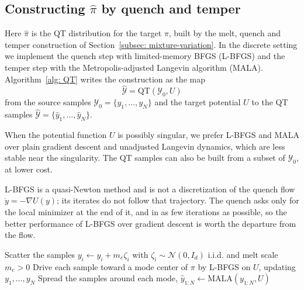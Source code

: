 \documentclass{article}
\begin{document}
\subsection{Constructing \texorpdfstring{$\hat\pi$}{pi-hat} by quench and temper}
\label{subsec: QT}

Here $\hat\pi$ is the QT distribution for the target $\pi$, built by the melt, quench and temper construction of Section~\ref{subsec: mixture-variation}. In the discrete setting we implement the quench step with limited-memory BFGS (L-BFGS) \citep{liu1989limited} and the temper step with the Metropolis-adjusted Langevin algorithm (MALA). Algorithm~\ref{alg: QT} writes the construction as the map
\begin{equation*}
    \hat{\mathcal Y} = \mathrm{QT}(\mathcal Y_0,U)
\end{equation*}
from the source samples $\mathcal Y_0=\{y_1,\dots,y_N\}$ and the target potential $U$ to the QT samples $\hat{\mathcal Y}=\{\hat y_1,\dots,\hat y_N\}$.

When the potential function $U$ is possibly singular, we prefer L-BFGS and MALA over plain gradient descent and unadjusted Langevin dynamics, which are less stable near the singularity. The QT samples can also be built from a subset of $\mathcal Y_0$, at lower cost.

\begin{remark}
	L-BFGS is a quasi-Newton method \citep{liu1989limited} and is not a discretization of the quench flow $\dot y = -\nabla U(y)$; its iterates do not follow that trajectory. The quench asks only for the local minimizer at the end of it, and in as few iterations as possible, so the better performance of L-BFGS over gradient descent is worth the departure from the flow.
\end{remark}

\begin{algorithm}[htb]
\caption{QT: wide-coverage construction}
\label{alg: QT}
Scatter the samples $y_i \gets y_i + m_e\zeta_i$ with $\zeta_i \sim \mathcal N(0, I_d)$ i.i.d. and melt scale $m_e > 0$\;
Drive each sample toward a mode center of $\pi$ by L-BFGS on $U$, updating $y_1,\dots,y_N$\;
Spread the samples around each mode, $\hat y_{1:N} \gets \mathrm{MALA}(y_{1:N}, U)$\;
\end{algorithm}
\end{document}
